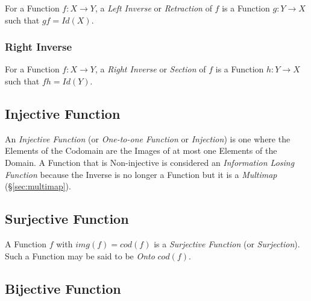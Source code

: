 For a Function $f: X \rightarrow Y$, a \emph{Left Inverse} or
\emph{Retraction} of $f$ is a Function $g: Y \rightarrow X$ such that
$gf = Id(X)$.



\subsubsection{Right Inverse}\label{sec:right_inverse}

For a Function $f: X \rightarrow Y$, a \emph{Right Inverse} or
\emph{Section} of $f$ is a Function $h: Y \rightarrow X$ such that $fh
= Id(Y)$.



\subsection{Injective Function}\label{sec:injective_function}

An \emph{Injective Function} (or \emph{One-to-one Function} or
\emph{Injection}) is one where the Elements of the Codomain are the
Images of at most one Elements of the Domain. A Function that is
Non-injective is considered an \emph{Information Losing Function}
because the Inverse is no longer a Function but it is a
\emph{Multimap} (\S\ref{sec:multimap}).



\subsection{Surjective Function}\label{sec:surjective_function}

A Function $f$ with $img(f) = cod(f)$ is a \emph{Surjective Function}
(or \emph{Surjection}). Such a Function may be said to be \emph{Onto}
$cod(f)$.



\subsection{Bijective Function}\label{sec:bijective_function}

